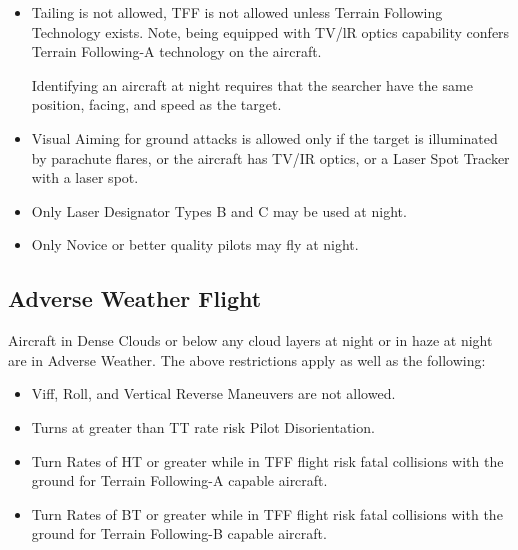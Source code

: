 \begin{advancedrules}
\begin{itemize}
        \item Tailing is not allowed, TFF is not allowed unless Terrain Following Technology exists. Note, being equipped with TV/lR optics capability confers Terrain Following-A technology on the aircraft.

             Identifying an aircraft at night requires that the searcher have the same position, facing, and speed as the target.

        \item Visual Aiming for ground attacks is allowed only if the target is illuminated by parachute flares, or the aircraft has TV/IR optics, or a Laser Spot Tracker with a laser spot.

        \item Only Laser Designator Types B and C may be used at night.

        \item Only Novice or better quality pilots may fly at night.

    \end{itemize}

    \subsection{Adverse Weather Flight} Aircraft in Dense Clouds or below any cloud layers at night or in haze at night are in Adverse Weather. The above restrictions apply as well as the following:

    \begin{itemize}

        \item Viff, Roll, and Vertical Reverse Maneuvers are not allowed.

        \item Turns at greater than TT rate risk Pilot Disorientation.

        \item Turn Rates of HT or greater while in TFF flight risk fatal collisions with the ground for Terrain Following-A capable aircraft.

        \item Turn Rates of BT or greater while in TFF flight risk fatal collisions with the ground for Terrain Following-B capable aircraft.



\end{itemize}
\end{advancedrules}
